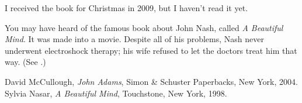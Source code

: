 \documentclass{article}
\begin{document}
I received the book \cite{dm} for Christmas in 2009, but I haven't read it yet.

You may have heard of the famous book about John Nash, called \textit{A Beautiful Mind}.  It was made
into a movie. Despite all of his problems, Nash never underwent electroshock therapy; his wife refused to
let the doctors treat him that way.  (See \cite[page 306]{sn}.)

\begin{thebibliography}{9}
    David McCullough,
    \emph{John Adams},
    Simon \& Schuster Paperbacks, New York, 2004.
    Sylvia Nasar,
    \emph{A Beautiful Mind},
    Touchstone, New York, 1998.
\end{thebibliography}
\end{document}
